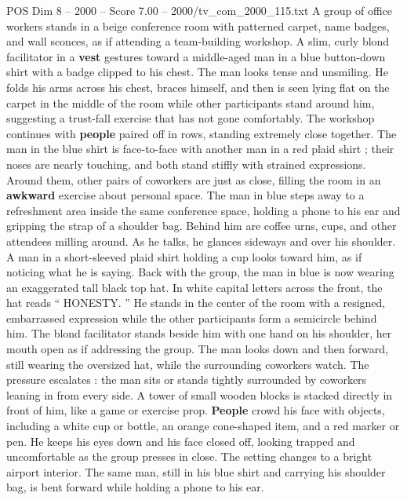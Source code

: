 \begin{textsample}{POS Dim 8 – 2000 – Score 7.00 – 2000/tv\_com\_2000\_115.txt}  \label{ex:f8_pos_015}
A group of office workers stands in a beige conference room with patterned carpet, name badges, and wall sconces, as if attending a team-building workshop.
A slim, curly blond facilitator in a \textbf{vest} gestures toward a middle-aged man in a blue button-down shirt with a badge clipped to his chest.
The man looks tense and unsmiling.
He folds his arms across his chest, braces himself, and then is seen lying flat on the carpet in the middle of the room while other participants stand around him, suggesting a trust-fall exercise that has not gone comfortably.
The workshop continues with \textbf{people} paired off in rows, standing extremely close together.
The man in the blue shirt is face-to-face with another man in a red plaid shirt ; their noses are nearly touching, and both stand stiffly with strained expressions.
Around them, other pairs of coworkers are just as close, filling the room in an \textbf{awkward} exercise about personal space.
The man in blue steps away to a refreshment area inside the same conference space, holding a phone to his ear and gripping the strap of a shoulder bag.
Behind him are coffee urns, cups, and other attendees milling around.
As he talks, he glances sideways and over his shoulder.
A man in a short-sleeved plaid shirt holding a cup looks toward him, as if noticing what he is saying.
Back with the group, the man in blue is now wearing an exaggerated tall black top hat.
In white capital letters across the front, the hat reads “ HONESTY. ” He stands in the center of the room with a resigned, embarrassed expression while the other participants form a semicircle behind him.
The blond facilitator stands beside him with one hand on his shoulder, her mouth open as if addressing the group.
The man looks down and then forward, still wearing the oversized hat, while the surrounding coworkers watch.
The pressure escalates : the man sits or stands tightly surrounded by coworkers leaning in from every side.
A tower of small wooden blocks is stacked directly in front of him, like a game or exercise prop. \textbf{People} crowd his face with objects, including a white cup or bottle, an orange cone-shaped item, and a red marker or pen.
He keeps his eyes down and his face closed off, looking trapped and uncomfortable as the group presses in close.
The setting changes to a bright airport interior.
The same man, still in his blue shirt and carrying his shoulder bag, is bent forward while holding a phone to his ear.

\end{textsample}
